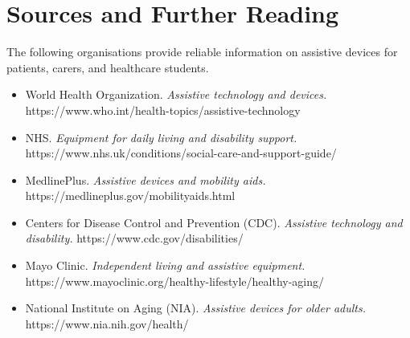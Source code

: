 \section*{Sources and Further Reading}
The following organisations provide reliable information on assistive devices for patients, carers, and healthcare students.

\begin{itemize}
    \item World Health Organization. \textit{Assistive technology and devices.} https://www.who.int/health-topics/assistive-technology
    \item NHS. \textit{Equipment for daily living and disability support.} https://www.nhs.uk/conditions/social-care-and-support-guide/
    \item MedlinePlus. \textit{Assistive devices and mobility aids.} https://medlineplus.gov/mobilityaids.html
    \item Centers for Disease Control and Prevention (CDC). \textit{Assistive technology and disability.} https://www.cdc.gov/disabilities/
    \item Mayo Clinic. \textit{Independent living and assistive equipment.} https://www.mayoclinic.org/healthy-lifestyle/healthy-aging/
    \item National Institute on Aging (NIA). \textit{Assistive devices for older adults.} https://www.nia.nih.gov/health/
\end{itemize}
